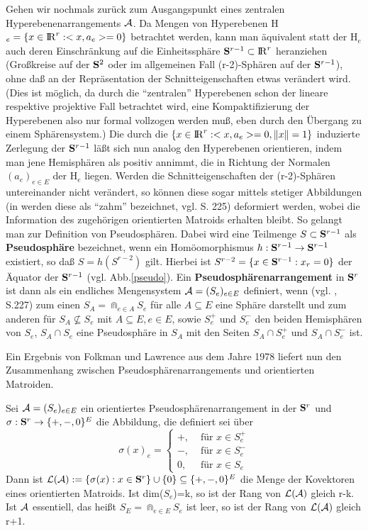 Gehen wir nochmals zurück zum Ausgangspunkt eines zentralen
Hyperebenenarrangements $\cal A$. Da Mengen von Hyperebenen
H$_e=\{x\in\R^r:<x,a_e>=0\}$ betrachtet werden, kann man äquivalent statt der
H$_e$ auch deren Einschränkung auf die Einheitssphäre $\S^{r-1}\subset\R^r$
heranziehen (Großkreise auf der $\S^2$ oder im allgemeinen Fall (r-2)-Sphären
auf der $\S^{r-1}$), ohne daß an der Repräsentation der Schnitteigenschaften
etwas verändert wird. (Dies ist möglich, da durch die "`zentralen"'
Hyperebenen schon der lineare respektive projektive Fall betrachtet wird,
eine Kompaktifizierung der Hyperebenen also nur formal vollzogen werden muß,
eben durch den Übergang zu einem Sphärensystem.)
Die durch die $\{x\in\R^r:<x,a_e>=0,\|x\|=1\}$ induzierte Zerlegung der
$\S^{r-1}$ läßt sich nun analog den Hyperebenen orientieren, indem man jene
Hemisphären als positiv annimmt, die in Richtung der Normalen $(a_e)_{e\in E}$
der H$_e$ liegen. Werden die Schnitteigenschaften der (r-2)-Sphären
untereinander nicht verändert, so können diese sogar mittels stetiger
Abbildungen (in \cite{Bj:93} werden diese als "`zahm"' bezeichnet, vgl. S. 225)
deformiert werden, wobei die Information des zugehörigen orientierten Matroids
erhalten bleibt. So gelangt man zur Definition von Pseudosphären. Dabei wird
eine Teilmenge $S\subset\S^{r-1}$ als {\bf Pseudosphäre}
bezeichnet, wenn ein Homöomorphismus $h:\S^{r-1}\to\S^{r-1}$ existiert, so
daß $S=h(S^{r-2})$ gilt. Hierbei ist $S^{r-2}=\{x\in\S^{r-1}:x_r=0\}$ der
Äquator der $\S^{r-1}$ (vgl. Abb.\ref{pseudo}). Ein {\bf
Pseudosphärenarrangement} in $\S^r$ ist dann als ein endliches Mengensystem
${\cal A}=(S_e)_{e\in E}$ definiert, wenn (vgl. \cite{Bj:93}, S.227) zum einen
$S_A=\Cap_{e\in A} S_e$ für alle $A\subseteq E$ eine Sphäre darstellt und zum
anderen für $S_A\not\subseteq S_e$ mit $A\subseteq E,e\in E$, sowie $S^+_e$ und
$S^-_e$ den beiden Hemisphären von $S_e$, $S_A\cap S_e$ eine Pseudosphäre in
$S_A$ mit den Seiten $S_A\cap S^+_e$ und $S_A\cap S^-_e$ ist.

Ein Ergebnis von Folkman und Lawrence aus dem Jahre 1978 liefert nun den
Zusammenhang zwischen Pseudosphärenarrangements und orientierten Matroiden.
\begin{satz}
Sei ${\cal A}=(S_e)_{e\in E}$ ein orientiertes Pseudosphärenarrangement in
der $\S^r$ und $\sigma:\S^r\to\{+,-,0\}^E$ die Abbildung, die definiert
sei über
$$\sigma(x)_e=\left\{\begin{array}{ll}
                        +, & \mbox{ für } x\in S^+_e\\
                        -, & \mbox{ für } x\in S^-_e\\
                        0, & \mbox{ für } x\in S_e\end{array}\right.$$
Dann ist ${\cal L(A)} := \{\sigma(x):x\in\S^r\}\cup\{0\}\subseteq\{+,-,0\}^E$
die Menge der Kovektoren eines orientierten Matroids. Ist dim($S_e$)=k, so
ist der Rang von $\cal L(A)$ gleich r-k. Ist $\cal A$ essentiell, das heißt
$S_E=\Cap_{e\in E} S_e$ ist leer, so ist der Rang von $\cal L(A)$ gleich r+1.
\end{satz}

